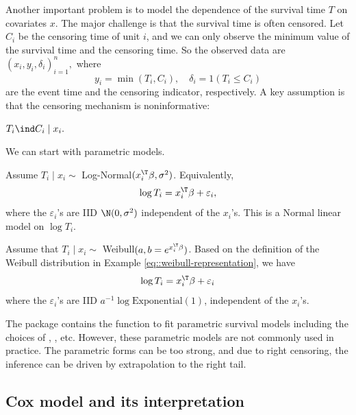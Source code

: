 Another important problem is to model the dependence of the survival time $T$ on covariates $x$. The major challenge is that the survival time is often censored. Let $C_i$ be the censoring time of unit $i$, and we can only observe the minimum value of the survival time and the censoring time. So the observed data are
$
(x_{i}, y_{i},\delta_{i})_{i=1}^{n}, 
$
where 
\[
y_{i}=\min(T_{i},C_{i}),\quad\delta_{i}=1(T_{i}\leq C_{i})
\]
are the event time and the censoring indicator, respectively. A key assumption is that the censoring mechanism is noninformative:
\begin{assumption}
\label{assume::non-informative-censoring}
$
T_{i}\ind C_{i}\mid x_{i}.
$
\end{assumption}



We can start with parametric models. 

\begin{example}\label{ex::log-normal-regression}
Assume $T_i \mid x_i \sim $ Log-Normal$(x_i^{\T}\beta, \sigma^2)$. Equivalently,
$$
\log T_i = x_i^{\T}\beta + \varepsilon_i , 
$$
where the $\varepsilon_i$'s are IID $\N(0,\sigma^2)$ independent of the $x_i$'s. This is a Normal linear model on $\log T_i$. 
\end{example}
 
 
 \begin{example}\label{ex::weibull-regression}
 Assume that $T_i \mid x_i \sim$ Weibull$(a, b= e^{x_i^{\T}\beta})$. Based on the definition of the Weibull distribution in Example \ref{eq::weibull-representation}, we have
 $$
 \log T_i = x_i^{\T} \beta+ \varepsilon_i
 $$
 where the $\varepsilon_i$'s are IID $a^{-1} \log \text{Exponential}(1)$, independent of the $x_i$'s. 
 \end{example}

 
The  package  contains the function  to fit parametric survival models including the choices of , , etc. However, these parametric models are not commonly used in practice. The parametric forms can be too strong, and due to right censoring, the inference can be driven by extrapolation to the right tail. 


\subsection{Cox model and its interpretation}

 

